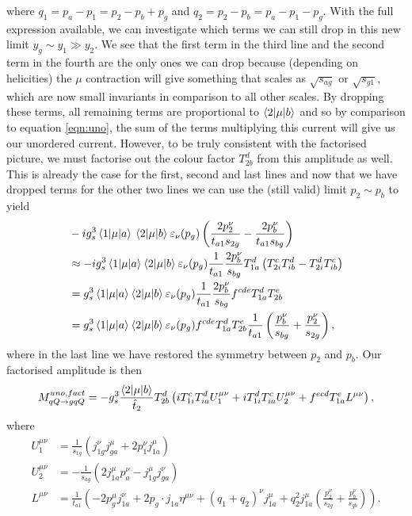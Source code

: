 where $q_1 = p_a - p_1 = p_2 - p_b + p_g$ and $q_2 = p_2 - p_b = p_a - p_1 - p_g$. With the full expression available, we can investigate which terms we can still drop in this new limit $y_g \sim y_1 \gg y_2$. We see that the first term in the third line and the second term in the fourth are the only ones we can drop because (depending on helicities) the $\mu$ contraction will give something that scales as $\sqrt{s_{ag}}$ or $\sqrt{s_{g1}}$, which are now small invariants in comparison to all other scales. By dropping these terms, all remaining terms are proportional to $\mathinner{\langle2\vert\mu\vert b\rangle}_{}$ and so by comparison to equation \ref{eqn:uno}, the sum of the terms multiplying this current will give us our unordered current. However, to be truly consistent with the factorised picture, we must factorise out the colour factor $T^d_{2b}$ from this amplitude as well. This is already the case for the first, second and last lines and now that we have dropped terms for the other two lines we can use the (still valid) limit $p_2 \sim p_b$ to yield
\begin{equation}
\begin{split}
& -ig_s^3 \mathinner{\langle1\vert\mu\vert a\rangle}_{}{} \mathinner{\langle2\vert\mu\vert b\rangle}_{} \varepsilon_\nu(p_g) \left(\frac{2p_2^\nu}{t_{a1} s_{2g}} - \frac{2p_b^\nu}{t_{a1} s_{bg}} \right) \\
& \approx -i g_s^3 \mathinner{\langle1\vert\mu\vert a\rangle}_{} \mathinner{\langle2\vert\mu\vert b\rangle}_{} \varepsilon_\nu(p_g) \frac{1}{t_{a1}}\frac{2p_b^\nu}{s_{bg}} T^d_{1a}\left(T^c_{2i}T^d_{ib} - T^d_{2i}T^c_{ib}\right)  \\
&= g_s^3 \mathinner{\langle1\vert\mu\vert a\rangle}_{} \mathinner{\langle2\vert\mu\vert b\rangle}_{} \varepsilon_\nu(p_g) \frac{1}{t_{a1}} \frac{2 p_b^\nu}{s_{bg}} f^{cde}T^d_{1a}T^e_{2b} \\
&= g_s^3 \mathinner{\langle1\vert\mu\vert a\rangle}_{} \mathinner{\langle2\vert\mu\vert b\rangle}_{} \varepsilon_\nu(p_g) f^{cde}T^d_{1a}T^e_{2b} \frac{1}{t_{a1}} \left(\frac{p_b^\nu}{s_{bg}}+\frac{p_2^\nu}{s_{2g}} \right),
\end{split}
\end{equation}
where in the last line we have restored the symmetry between $p_2$ and $p_b$. Our factorised amplitude is then
\begin{equation}
M_{qQ \to gqQ}^{uno, fact} = -g_s^3 \frac{\mathinner{\langle2\vert\mu\vert b\rangle}_{}}{\hat{t}_2}T_{2b}^d \left(iT^c_{1i}T^d_{ia}U_1^{\mu \nu} + iT^d_{1i}T^c_{ia}U_2^{\mu \nu} + f^{ecd}T^e_{1a}L^{\mu \nu} \right),
\end{equation}
where
\begin{equation}
\begin{split}
U_1^{\mu \nu} &= \frac{1}{s_{1g}}(j^\nu_{1g}j^\mu_{ga} + 2 p_1^\nu j^\mu_{1a}) \\
U_2^{\mu \nu} &= -\frac{1}{s_{ag}}(2j^\mu_{1a}p_a^\nu - j^\mu_{1g}j^\nu_{ga}) \\
L^{\mu \nu} &= \frac{1}{t_{a1}} \left(-2p^\mu_g j^\nu_{1a} + 2 p_g \cdot j_{1a}\eta^{\mu \nu} + (q_1 + q_2)^\nu j^{\mu}_{1a} + q_2^2 j^\mu_{1a} \left(\frac{p_2^\nu}{s_{2g}} + \frac{p_b^\nu}{s_{gb}} \right) \right).
\end{split}
\end{equation}
